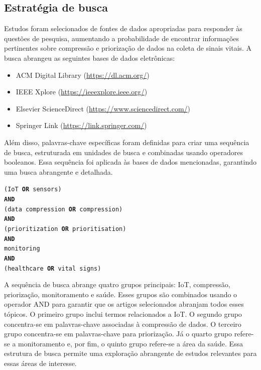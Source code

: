 \documentclass[twoside,english,brazilian]{UNISINOSmonografia}
\begin{document}
\subsection{Estratégia de busca}
\label{sec:strat}

Estudos foram selecionados de fontes de dados apropriadas para responder às questões de pesquisa, aumentando a probabilidade de encontrar informações pertinentes sobre compressão e priorização de dados na coleta de sinais vitais. A busca abrangeu as seguintes bases de dados eletrônicas:

\begin{itemize}
    \item ACM Digital Library (\url{https://dl.acm.org/})
    \item IEEE Xplore (\url{https://ieeexplore.ieee.org/})
    \item Elsevier ScienceDirect (\url{https://www.sciencedirect.com/})
    \item Springer Link (\url{https://link.springer.com/})
\end{itemize}

Além disso, palavras-chave específicas foram definidas para criar uma sequência de busca, estruturada em unidades de busca e combinadas usando operadores booleanos. Essa sequência foi aplicada às bases de dados mencionadas, garantindo uma busca abrangente e detalhada.

\begin{center}
	\texttt{(IoT \textbf{OR} sensors)} \\
	\texttt{\textbf{AND}} \\
	\texttt{(data compression \textbf{OR} compression)} \\
	\texttt{\textbf{AND}} \\
	\texttt{(prioritization \textbf{OR} prioritisation)} \\
	\texttt{\textbf{AND}} \\
	\texttt{monitoring} \\
	\texttt{\textbf{AND}} \\
	\texttt{(healthcare \textbf{OR} vital signs)} \\
\end{center}

A sequência de busca abrange quatro grupos principais: IoT, compressão, priorização, monitoramento e saúde. Esses grupos são combinados usando o operador AND para garantir que os artigos selecionados abranjam todos esses tópicos. O primeiro grupo inclui termos relacionados a IoT. O segundo grupo concentra-se em palavras-chave associadas à compressão de dados. O terceiro grupo concentra-se em palavras-chave para priorização. Já o quarto grupo refere-se a monitoramento e, por fim, o quinto grupo refere-se a área da saúde. Essa estrutura de busca permite uma exploração abrangente de estudos relevantes para essas áreas de interesse.
\end{document}

